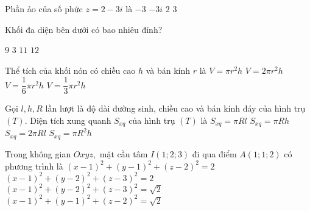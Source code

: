\begin{ex}%
Phần ảo của số phức $z=2-3i$ là	
\choice
{\True $-3$}
{$-3i$}
{$2$}
{$3$}
\end{ex}  

\begin{ex}%
Khối đa diện bên dưới có bao nhiêu đỉnh?
\begin{center}
\end{center}
\choice
{$9$}
{$3$}
{$11$}
{\True $12$}
\end{ex}  

\begin{ex}%
Thể tích của khối nón có chiều cao $h$ và bán kính $r$ là
\choice
{$V=\pi r^2 h$}
{$V=2\pi r^2 h$}
{$V=\dfrac{1}{6}\pi r^2 h$}
{\True $V=\dfrac{1}{3}\pi r^2 h$}
\end{ex}

\begin{ex}%
Gọi $l,h,R$ lần lượt là độ dài đường sinh, chiều cao và bán kính đáy của hình trụ $(T)$. Diện tích xung quanh $S_{xq}$ của hình trụ $(T)$ là
\choice
{$S_{xq}=\pi Rl$}
{$S_{xq}=\pi Rh$}
{\True $S_{xq}=2\pi Rl$}
{$S_{xq}=\pi R^2h$}
\end{ex}

\begin{ex}%
Trong không gian $Oxyz,$ mặt cầu tâm $I(1;2;3)$ đi qua điểm $A(1;1;2)$ có phương trình là
\choice
{$(x-1)^2+(y-1)^2+(z-2)^2=2$}
{\True $(x-1)^2+(y-2)^2+(z-3)^2=2$}
{$(x-1)^2+(y-2)^2+(z-3)^2=\sqrt{2}$}
{$(x-1)^2+(y-1)^2+(z-2)^2=\sqrt{2}$}
\end{ex}

